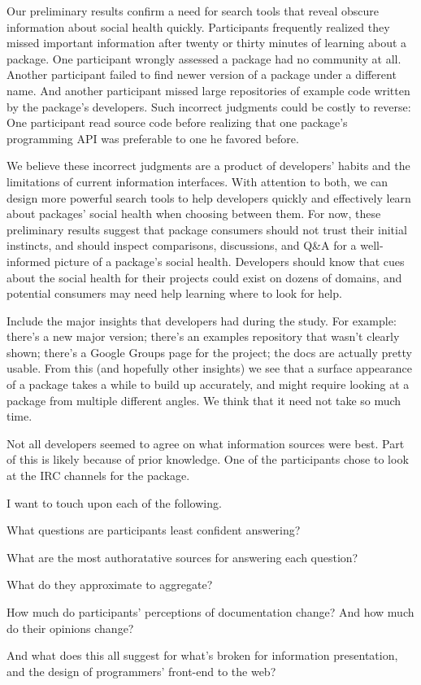 Our preliminary results confirm a need for search tools that reveal obscure information about social health quickly.
Participants frequently realized they missed important information after twenty or thirty minutes of learning about a package.
One participant wrongly assessed a package had no community at all.
Another participant failed to find newer version of a package under a different name.
And another participant missed large repositories of example code written by the package's developers.
Such incorrect judgments could be costly to reverse:
One participant read source code before realizing that one package's programming API was preferable to one he favored before.

We believe these incorrect judgments are a product of developers' habits and the limitations of current information interfaces.
With attention to both, we can design more powerful search tools to help developers quickly and effectively learn about packages' social health when choosing between them.
For now, these preliminary results suggest that
package consumers should not trust their initial instincts,
and should inspect comparisons, discussions, and Q\&A for a well-informed picture of a package's social health.
Developers should know that cues about the social health for their projects could exist on dozens of domains,
and potential consumers may need help learning where to look for help.

Include the major insights that developers had during the study.
For example:
there's a new major version;
there's an examples repository that wasn't clearly shown;
there's a Google Groups page for the project;
the docs are actually pretty usable.
From this (and hopefully other insights) we see that a surface appearance of a package takes a while to build up accurately, and might require looking at a package from multiple different angles.
We think that it need not take so much time.

Not all developers seemed to agree on what information sources were best.
Part of this is likely because of prior knowledge.
One of the participants chose to look at the IRC channels for the package.

I want to touch upon each of the following.

What questions are participants least confident answering?

What are the most authoratative sources for answering each question?

What do they approximate to aggregate?

How much do participants' perceptions of documentation change?  And how much do their opinions change?

And what does this all suggest for what's broken for information presentation, and the design of programmers' front-end to the web?
\fi

